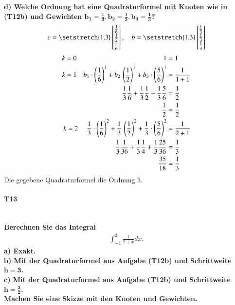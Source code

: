 \documentclass[10pt,a4paper]{article}
\begin{document}
    \textbf{%
        d) Welche Ordnung hat eine Quadraturformel mit Knoten wie in (T12b) und Gewichten $\pmb{b_1=\frac{1}{3}, b_2=\frac{1}{3}, b_3=\frac{1}{3}}$?
    }\\
	\begin{align*}
		c = \begingroup %
			\setstretch{1.3}
			\begin{bmatrix}
				\frac{1}{6} \\
				\frac{1}{2} \\
				\frac{5}{6}
			\end{bmatrix}
			\endgroup,  \quad
		b = \begingroup %
			\setstretch{1.3}
			\begin{bmatrix}
				\frac{1}{3} \\
				\frac{1}{3} \\
				\frac{1}{3}
			\end{bmatrix}
			\endgroup
	\end{align*}
	\begin{align*}
		k=0 \hspace{4.5cm}1&=1 \\
		k=1  \quad  b_1\cdot \left( \frac{1}{6}\right)^1+  b_2  \, \left(\frac{1}{2} \right)^1+  b_3\cdot\left( \frac{5}{6}\right)^1 & = \frac{1}{1+1} \\
		\frac{1}{3}\frac{1}{6}+ \frac{1}{3}  \frac{1}{2} + \frac{1}{3} \frac{5}{6}                                                   & = \frac{1}{2} \\
		\frac{1}{2} & = \frac{1}{2} \\
		k=2 \hspace{0.1cm} \quad  \frac{1}{3}\cdot \left( \frac{1}{6}\right)^2+  \frac{1}{3}  \, \left(\frac{1}{2} \right)^2+  \frac{1}{3}\cdot\left( \frac{5}{6}\right)^2 & = \frac{1}{2+1} \\
		\frac{1}{3}\frac{1}{36}+  \frac{1}{3}  \frac{1}{4} + \frac{1}{3} \frac{25}{36} & = \frac{1}{3} \\
		\frac{35}{18} &= \frac{1}{3}
	\end{align*}
	Die gegebene Quadraturformel die Ordnung 3.
    \pagebreak
    \paragraph{T13}\mbox{}\\
    \textbf{%
        Berechnen Sie das Integral
        \begin{align*}
            \int_{-1}^{2}\frac{1}{2+x}dx.
        \end{align*}
        a) Exakt. \\
        b) Mit der Quadraturformel aus Aufgabe (T12b) und Schrittweite $\pmb{h=3}$. \\
        c) Mit der Quadraturformel aus Aufgabe (T12b) und Schrittweite $\pmb{h=\frac{3}{2}}$. \\
        Machen Sie eine Skizze mit den Knoten und Gewichten.
    }\\
	
\end{document}
